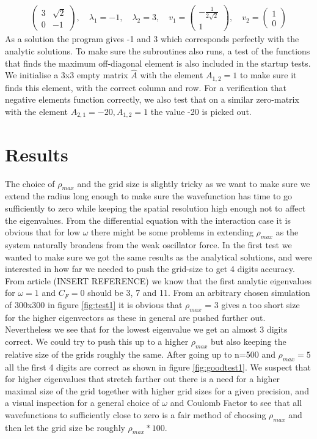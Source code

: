 \documentclass[a4paper,11pt]{article}
\begin{document}
{\begin{align}
\begin{pmatrix}
3 & \sqrt{2} \\
0 & -1 
\end{pmatrix}
, \quad \lambda_1 = -1, \quad \lambda_2 = 3, \quad v_1 = \begin{pmatrix}
-\frac{1}{2\sqrt{2}} \\
1
\end{pmatrix}, \quad v_2 = \begin{pmatrix}
1 \\
0
\end{pmatrix}
\end{align}
As a solution the program gives -1 and 3 which corresponds perfectly with the analytic solutions. To make sure the subroutines also runs, a test of the functions that finds the maximum off-diagonal element is also included in the startup tests. We initialise a 3x3 empty matrix $\hat{A}$ with the element $A_{1,2}=1$ to make sure it finds this element, with the correct column and row. For a verification that negative elements function correctly, we also test that on a similar zero-matrix with the element $A_{2,1}=-20, A_{1,2}=1$ the value -20 is picked out. 






\section*{Results}
The choice of $\rho_{max}$ and the grid size is slightly tricky as we want to make sure we extend the radius long enough to make sure the wavefunction has time to go sufficiently to zero while keeping the spatial resolution high enough not to affect the eigenvalues. From the differential equation with the interaction case it is obvious that for low $\omega$ there might be some problems in extending $\rho_{max}$ as the system naturally broadens from the weak oscillator force. In the first test we wanted to make sure we got the same results as the analytical solutions, and were interested in how far we needed to push the grid-size to get 4 digits accuracy. From  article (INSERT REFERENCE) we know that the first analytic eigenvalues for $\omega = 1$ and $C_F=0$ should be 3, 7 and 11.  From an arbitrary chosen simulation of 300x300 in figure \ref{fig:test1} it is obvious that $\rho_{max}$ = 3 gives a too short size for the higher eigenvectors as these in general are pushed further out. Nevertheless we see that for the lowest eigenvalue we get an almost 3 digits correct. We could try to push this up to a higher $\rho_{max}$ but also keeping the relative size of the grids roughly the same.  After going up to n=500 and $\rho_{max}=5$ all the first 4 digits are correct as shown in figure \ref{fig:goodtest1}. We suspect that for higher eigenvalues that stretch farther out there is a need for a higher maximal size of the grid together with higher grid sizes for a given precision, and a visual inspection for a general choice of $\omega$ and Coulomb Factor to see that all wavefunctions to sufficiently close to zero is a fair method of choosing $\rho_{max}$ and then let the grid size be roughly $\rho_{max}*100$. 

}
\end{document}
